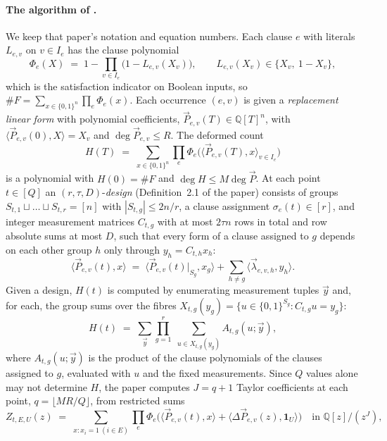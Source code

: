 \documentclass[11pt]{article}
\theoremstyle{definition}
\theoremstyle{remark}
\newcommand{\Phie}{\Phi_e}
\newcommand{\cnt}{\#F}
\newcommand{\Qq}{\mathbb{Q}}
\newcommand{\angles}[1]{\langle #1 \rangle}
\begin{document}
\paragraph{The algorithm of \citet{OpenAI26}.} We keep that paper's notation and equation numbers. Each clause $e$ with literals $L_{e,v}$ on $v \in I_e$ has the clause polynomial
\[
\Phie(X) \;=\; 1 - \prod_{v \in I_e}\bigl(1 - L_{e,v}(X_v)\bigr), \qquad L_{e,v}(X_v) \in \{X_v,\ 1 - X_v\},
\]
which is the satisfaction indicator on Boolean inputs, so $\cnt = \sum_{x \in \{0,1\}^n} \prod_e \Phie(x)$. Each occurrence $(e, v)$ is given a \emph{replacement linear form} with polynomial coefficients, $\vec P_{e,v}(T) \in \Qq[T]^n$, with $\angles{\vec P_{e,v}(0), X} = X_v$ and $\deg \vec P_{e,v} \le R$. The deformed count
\[
H(T) \;=\; \sum_{x \in \{0,1\}^n} \prod_{e} \Phie\bigl(\angles{\vec P_{e,v}(T), x}_{v \in I_e}\bigr)
\]
is a polynomial with $H(0) = \cnt$ and $\deg H \le M \deg \vec P$. At each point $t \in [Q]$ an $(r, \tau, D)$-\emph{design} (Definition~2.1 of the paper) consists of groups $S_{t,1} \sqcup \dots \sqcup S_{t,r} = [n]$ with $|S_{t,g}| \le 2n/r$, a clause assignment $\sigma_e(t) \in [r]$, and integer measurement matrices $C_{t,g}$ with at most $2\tau n$ rows in total and row absolute sums at most $D$, such that every form of a clause assigned to $g$ depends on each other group $h$ only through $y_h = C_{t,h} x_h$:
\begin{equation}\tag{2.5}
\angles{\vec P_{e,v}(t), x} \;=\; \angles{\vec P_{e,v}(t)|_{S_g}, x_g} + \sum_{h \ne g} \angles{\vec\lambda_{e,v,h}, y_h}.
\end{equation}
Given a design, $H(t)$ is computed by enumerating measurement tuples $\vec y$ and, for each, the group sums over the fibres $X_{t,g}(y_g) = \{u \in \{0,1\}^{S_g} : C_{t,g} u = y_g\}$:
\begin{equation}\tag{2.6}
H(t) \;=\; \sum_{\vec y} \prod_{g=1}^{r} \;\sum_{u \in X_{t,g}(y_g)} A_{t,g}(u; \vec y),
\end{equation}
where $A_{t,g}(u; \vec y)$ is the product of the clause polynomials of the clauses assigned to $g$, evaluated with $u$ and the fixed measurements. Since $Q$ values alone may not determine $H$, the paper computes $J = q + 1$ Taylor coefficients at each point, $q = \lfloor M R / Q \rfloor$, from restricted sums
\begin{equation}\tag{2.8}
Z_{t,E,U}(z) \;=\; \sum_{x : x_i = 1\ (i \in E)} \prod_e \Phie\bigl(\angles{\vec P_{e,v}(t), x} + \angles{\Delta \vec P_{e,v}(z), \mathbf 1_U}\bigr) \quad \text{in } \Qq[z]/(z^J),
\end{equation}
\end{document}
